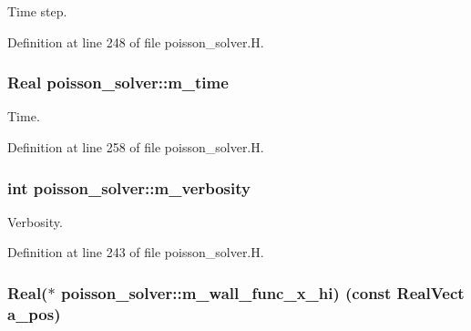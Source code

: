 Time step. 



Definition at line 248 of file poisson\+\_\+solver.\+H.

\subsubsection[{\texorpdfstring{m\+\_\+time}{m_time}}]{\setlength{\rightskip}{0pt plus 5cm}Real poisson\+\_\+solver\+::m\+\_\+time\hspace{0.3cm}{\ttfamily [protected]}}\hypertarget{classpoisson__solver_af19d79c7601cacad39200c70aed9dc18}{}\label{classpoisson__solver_af19d79c7601cacad39200c70aed9dc18}


Time. 



Definition at line 258 of file poisson\+\_\+solver.\+H.

\subsubsection[{\texorpdfstring{m\+\_\+verbosity}{m_verbosity}}]{\setlength{\rightskip}{0pt plus 5cm}int poisson\+\_\+solver\+::m\+\_\+verbosity\hspace{0.3cm}{\ttfamily [protected]}}\hypertarget{classpoisson__solver_a8a86e657da4585578123ef2042ada218}{}\label{classpoisson__solver_a8a86e657da4585578123ef2042ada218}


Verbosity. 



Definition at line 243 of file poisson\+\_\+solver.\+H.

\subsubsection[{\texorpdfstring{m\+\_\+wall\+\_\+func\+\_\+x\+\_\+hi}{m_wall_func_x_hi}}]{\setlength{\rightskip}{0pt plus 5cm}Real($\ast$ poisson\+\_\+solver\+::m\+\_\+wall\+\_\+func\+\_\+x\+\_\+hi) (const Real\+Vect a\+\_\+pos)\hspace{0.3cm}{\ttfamily [protected]}}\hypertarget{classpoisson__solver_aad7e81c6a8e45636d9df8361b79bb879}{}\label{classpoisson__solver_aad7e81c6a8e45636d9df8361b79bb879}


